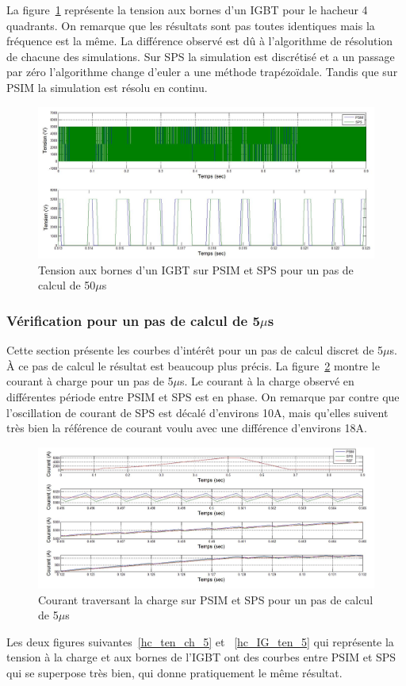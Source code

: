\documentclass[11pt,letterpaper,final]{report}
\begin{document}
La figure~\ref{hc_IG_ten_50} représente la tension aux bornes d'un IGBT pour le hacheur 4 quadrants. On remarque que les résultats sont pas toutes identiques mais la fréquence est la même. La différence observé est dû à l'algorithme de résolution de chacune des simulations. Sur SPS la simulation est discrétisé et a un passage par zéro l'algorithme change d'euler a une méthode trapézoïdale. Tandis que sur PSIM la simulation est résolu en continu.
\begin{figure}[htb]
\centering
\includegraphics[scale=0.5]{Fig/Hacheur4Quadrants/HacheurTensionIGBT50u.jpg}
\caption{Tension aux bornes d'un IGBT sur PSIM et SPS pour un pas de calcul de 50$\mu$s}
\label{hc_IG_ten_50}
\end{figure}

\clearpage
\subsubsection{Vérification pour un pas de calcul de 5$\mu$s}
Cette section présente les courbes d'intérêt pour un pas de calcul discret de 5$\mu$s. À ce pas de calcul le résultat est beaucoup plus précis. La figure~\ref{hc_cou_ch_5}
montre le courant à charge pour un pas de 5$\mu$s.  Le courant à la charge observé en différentes période entre PSIM et SPS est en phase. On remarque par contre que l'oscillation de courant de SPS est décalé d'environs 10A, mais qu'elles suivent très bien la référence de courant voulu avec une différence d'environs 18A.
\begin{figure}[htb]
\centering
\includegraphics[scale=0.5]{Fig/Hacheur4Quadrants/HacheurCourantCharge5u.jpg}
\caption{Courant traversant la charge sur PSIM et SPS pour un pas de calcul de 5$\mu$s}
\label{hc_cou_ch_5}
\end{figure}
Les deux figures suivantes~\ref{hc_ten_ch_5} et ~\ref{hc_IG_ten_5} qui représente la tension à la charge et aux bornes de l'IGBT ont des courbes entre PSIM et SPS qui se superpose très bien, qui donne pratiquement le même résultat.
\end{document}
